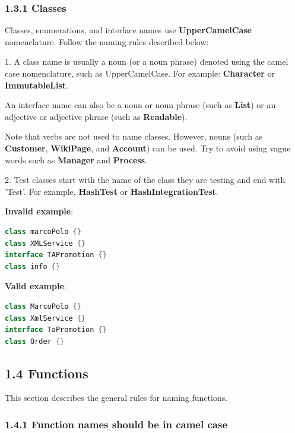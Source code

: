 \subsubsection*{\textbf{1.3.1 Classes}}
\leavevmode\newline

\label{sec:1.3.1}

Classes, enumerations, and interface names use \textbf{UpperCamelCase} nomenclature. Follow the naming rules described below:

1.	A class name is usually a noun (or a noun phrase) denoted using the camel case nomenclature, such as UpperCamelCase. For example: \textbf{Character} or \textbf{ImmutableList}.

An interface name can also be a noun or noun phrase (such as \textbf{List}) or an adjective or adjective phrase (such as \textbf{Readable}).

Note that verbs are not used to name classes. However, nouns (such as \textbf{Customer}, \textbf{WikiPage}, and \textbf{Account}) can be used. Try to avoid using vague words such as \textbf{Manager} and \textbf{Process}.



2.	Test classes start with the name of the class they are testing and end with 'Test'. For example, \textbf{HashTest} or \textbf{HashIntegrationTest}.



\textbf{Invalid example}: 

\begin{lstlisting}[language=Kotlin]
class marcoPolo {} 
class XMLService {} 
interface TAPromotion {}
class info {}
\end{lstlisting}


\textbf{Valid example}: 

\begin{lstlisting}[language=Kotlin]
class MarcoPolo {}
class XmlService {}
interface TaPromotion {}
class Order {}
\end{lstlisting}


\subsection*{\textbf{1.4 Functions}}

\label{sec:1.4}

This section describes the general rules for naming functions.

\subsubsection*{\textbf{1.4.1 Function names should be in camel case}}
\leavevmode\newline

